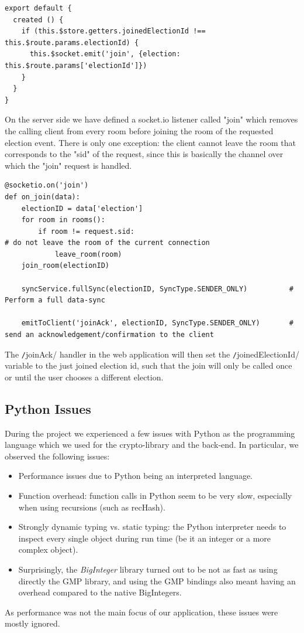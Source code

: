 \begin{verbatim}
export default {
  created () {
    if (this.$store.getters.joinedElectionId !== this.$route.params.electionId) {
      this.$socket.emit('join', {election: this.$route.params['electionId']})
    }
  }
}
\end{verbatim}
On the server side we have defined a socket.io listener called "{}join"{} which removes the calling client from every room before joining the room of the requested election event. There is only one exception: the client cannot leave the room that corresponds to the "{}sid"{} of the request, since this is basically the channel over which the "{}join"{} request is handled.
\begin{verbatim}
@socketio.on('join')
def on_join(data):
    electionID = data['election']
    for room in rooms():
        if room != request.sid:																	# do not leave the room of the current connection
            leave_room(room)
    join_room(electionID)

    syncService.fullSync(electionID, SyncType.SENDER_ONLY)			# Perform a full data-sync

    emitToClient('joinAck', electionID, SyncType.SENDER_ONLY)		# send an acknowledgement/confirmation to the client
\end{verbatim}

The \texttt/joinAck/ handler in the web application will then set the \texttt/joinedElectionId/ variable to the just joined election id, such that the join will only be called once or until the user chooses a different election.

\subsection{Python Issues} \label{ssec:PythonIssues}

During the project we experienced a few issues with Python as the programming language which we used for the crypto-library and the back-end. In particular, we observed the following issues:

\begin{itemize}
	\item Performance issues due to Python being an interpreted language.
	\item Function overhead: function calls in Python seem to be very slow, especially when using recursions (such as recHash).
	\item Strongly dynamic typing vs. static typing: the Python interpreter needs to inspect every single object during run time (be it an integer or a more complex object).
	\item Surprisingly, the \textit{BigInteger} library turned out to be not as fast as using directly the GMP library, and using the GMP bindings also meant having an overhead compared to the native BigIntegers.
\end{itemize}
As performance was not the main focus of our application, these issues were mostly ignored.

